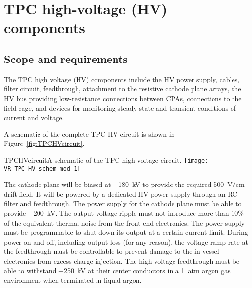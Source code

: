 




\section{TPC high-voltage (HV) components}

\subsection{Scope and requirements}

The TPC high voltage (HV) components include the HV power supply, cables,
filter circuit, feedthrough, attachment to the resistive cathode plane
arrays, the HV bus providing low-resistance connections between CPAs,
connections to the field cage, and devices for monitoring steady state
and transient conditions of current and voltage.

A schematic of the complete TPC HV circuit is shown in Figure~\ref{fig:TPCHVcircuit}.

\begin{cdrfigure}{TPCHVcircuit}{A schematic of the TPC high voltage circuit.}
  \texttt{[image: VR\_TPC\_HV\_schem-mod-1]}
\end{cdrfigure}


The cathode plane will be biased at \SI{-180}{kV} to provide the
required \SI{500}{V/cm} drift field.  It will be
powered by a dedicated HV power supply through an RC filter and
feedthrough.  The power supply for the cathode plane must be able
to provide \SI{-200}{kV}.  The output voltage
ripple must not introduce more than 10\%
of the equivalent thermal
noise from the front-end electronics. The power supply must be
programmable to shut down its output at a certain current
limit. During power on and off, including output loss (for any
reason), the voltage ramp rate at the feedthrough must be controllable
to prevent damage to the in-vessel electronics from excess charge
injection. The high-voltage feedthrough must be able to withstand \SI{-250}{kV}
at their center conductors in a \SI{1}{atm} argon gas environment when
terminated in liquid argon.

